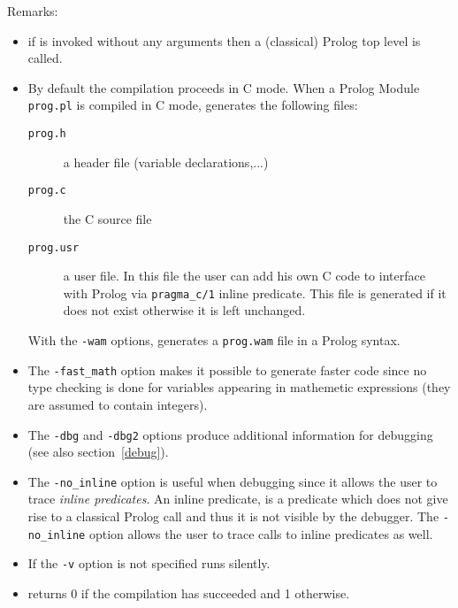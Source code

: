 Remarks:\\

\begin{itemize}

\item if {\wamcc} is invoked without any arguments then a (classical)
	Prolog top level is called.

\item By default the compilation proceeds in C mode. 
	When a Prolog Module {\tt prog.pl} is compiled in C mode, {\wamcc}
	generates the following files:

	\begin{description}

	\item [{\tt prog.h}] a header file (variable declarations,...)

	\item [{\tt prog.c}] the C source file

	\item [{\tt prog.usr}] a user file. In this file the user can add his
		own C code to interface with Prolog via {\tt pragma\_c/1}
		inline predicate. This file is generated if it does not exist
		otherwise it is left unchanged.

	\end{description}

	With the {\tt -wam} options, {\wamcc} generates a
 	{\tt prog.wam} file in a Prolog syntax.

\item The {\tt -fast\_math} option makes it possible to generate
	faster code since  no type checking is done for variables
	appearing in mathemetic expressions (they are assumed to
	contain integers).  	

\item The {\tt -dbg} and {\tt -dbg2} options produce additional
      information for debugging (see also section~\ref{debug}). 

\item The {\tt -no\_inline} option is useful when debugging since it allows
	the user to trace {\em inline predicates}. An inline predicate, is a
	predicate which does not give rise to a classical Prolog call
	and thus it is not visible by the debugger. The
 	{\tt -no\_inline} option allows the user to trace calls to
	inline predicates as well.

\item If the {\tt -v} option is not specified {\wamcc} runs silently.

\item {\wamcc} returns 0 if the compilation has succeeded and 1
	otherwise.

\end{itemize}



